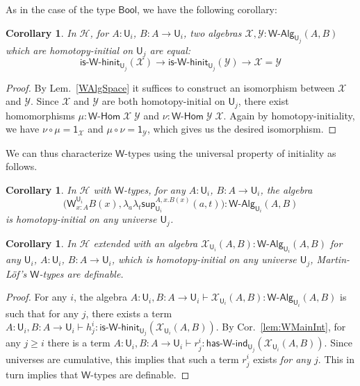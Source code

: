 \documentclass[reqno,10pt,a4paper,oneside]{amsart}
\newcommand{\X}{\mathcal{X}}
\newcommand{\Y}{\mathcal{Y}}
\newcommand{\comp}{\circ}
\newcommand{\lam}[1]{\lambda_{#1}}
\newcommand{\W}{\mathsf{W}}
\newcommand{\wsup}{\mathsf{sup}}
\newcommand{\Bool}{\mathsf{Bool}}
\newcommand{\one}{\mathsf{1}}
\newcommand{\UU}{\mathsf{U}}
\newcommand{\WAlg}{\mathsf{W}\text{-}\mathsf{Alg}}
\newcommand{\WHom}{\mathsf{W}\text{-}\mathsf{Hom}}
\newcommand{\HasWInd}{\mathsf{has}\text{-}\mathsf{W}\text{-}\mathsf{ind}}
\newcommand{\IsWHInit}{\mathsf{is}\text{-}\mathsf{\W}\text{-}\mathsf{hinit}}
\newcommand{\Hint}{\mathcal{H}}
\numberwithin{equation}{section}
\theoremstyle{mythm}
\newtheorem{corollary}[theorem]{Corollary}
\theoremstyle{mydef}
\theoremstyle{myrmk}
\begin{document}
As in the case of the type $\Bool$, we have the following corollary:
\begin{corollary}\label{WHInitIso}
In $\Hint$, for $A:\UU_i$, $B : A \to \UU_i$, two algebras $\X,\Y : \WAlg_{\UU_j}(A,B)$ which are homotopy-initial on $\UU_j$ are equal:
\[ \IsWHInit_{\UU_j}(\X) \to \IsWHInit_{\UU_j}(\Y) \to \X = \Y\] 
\end{corollary}
\begin{proof}
By Lem.~\ref{WAlgSpace} it suffices to construct an isomorphism between $\X$ and $\Y$. Since $\X$ and $\Y$ are both homotopy-initial on $\UU_j$, there exist homomorphisms $\mu : \WHom \; \X \; \Y$ and $\nu : \WHom \; \Y \; \X$. Again by homotopy-initiality, we have $\nu \comp \mu = \one_\X$ and $\mu \comp \nu = \one_\Y$, which gives us the desired isomorphism.
\end{proof}

We can thus characterize $\W$-types using the universal property of initiality as follows.
\begin{corollary}\label{lem:WInitInt}
In $\Hint$ with $\W$-types, for any $A:\UU_i$, $B : A \to \UU_i$, the algebra \[\Big(\W^{\UU_i}_{x:A}B(x),\lam{a}\lam{t} \wsup_{\UU_i}^{A,x.B(x)}(a,t) \Big) : \WAlg_{\UU_i}(A,B)\] is homotopy-initial on any universe $\UU_j$.
\end{corollary}

\begin{corollary}\label{lem:WCharInt}
In $\Hint$ extended with an algebra $\X_{\UU_i}(A,B) : \WAlg_{\UU_i}(A,B)$ for any $\UU_i$, $A : \UU_i$, $B : A \to \UU_i$, which is homotopy-initial on any universe $\UU_j$, Martin-L{\"o}f's $\W$-types are definable.
\end{corollary}
\begin{proof}
For any $i$, the algebra $A:\UU_i,B:A\to \UU_i \vdash \X_{\UU_i}(A,B) : \WAlg_{\UU_i}(A,B)$ is such that for any $j$, there exists a term $A:\UU_i,B:A\to \UU_i \vdash h^i_j  : \IsWHInit_{\UU_j}(\X_{\UU_i}(A,B))$. By Cor.~\ref{lem:WMainInt}, for any $j \geq i$ there is a term $A:\UU_i,B:A\to \UU_i \vdash r^i_j : \HasWInd_{\UU_j}(\X_{\UU_i}(A,B))$. Since universes are cumulative, this implies that such a term $r^i_j$ exists \emph{for any $j$}. This in turn implies that $\W$-types are definable.
\end{proof}
\end{document}
